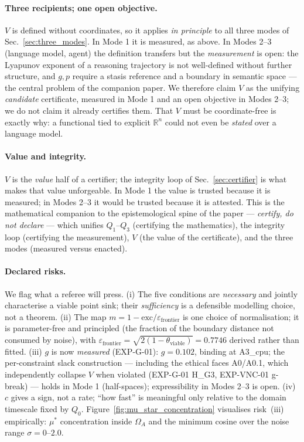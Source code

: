 \documentclass[11pt, a4paper]{article}
\newcommand{\R}{\mathbb{R}}
\begin{document}
\paragraph{Three recipients; one open objective.} $V$ is defined without
coordinates, so it applies \emph{in principle} to all three modes of
Sec.~\ref{sec:three_modes}. In Mode 1 it is measured, as above. In Modes 2--3
(language model, agent) the definition transfers but the \emph{measurement} is
open: the Lyapunov exponent of a reasoning trajectory is not well-defined without
further structure, and $g, p$ require a stasis reference and a boundary in
semantic space --- the central problem of the companion paper. We therefore
claim $V$ as the unifying \emph{candidate} certificate, measured in Mode 1 and an
open objective in Modes 2--3; we do not claim it already certifies them. That
$V$ must be coordinate-free is exactly why: a functional tied to explicit $\R^n$
could not even be \emph{stated} over a language model.

\paragraph{Value and integrity.} $V$ is the \emph{value} half of a certifier; the
integrity loop of Sec.~\ref{sec:certifier} is what makes that value unforgeable.
In Mode 1 the value is trusted because it is measured; in Modes 2--3 it would be
trusted because it is attested. This is the mathematical companion to the
epistemological spine of the paper --- \emph{certify, do not declare} ---
which unifies $Q_1$--$Q_3$ (certifying the mathematics), the integrity loop
(certifying the measurement), $V$ (the value of the certificate), and the three
modes (measured versus enacted).

\paragraph{Declared risks.} We flag what a referee will press. (i) The five
conditions are \emph{necessary} and jointly characterise a viable point sink;
their \emph{sufficiency} is a defensible modelling choice, not a theorem.
(ii) The map $m = 1 - \mathrm{exc}/\varepsilon_\text{frontier}$ is one choice of
normalisation; it is parameter-free and principled (the fraction of the boundary
distance not consumed by noise), with
$\varepsilon_\text{frontier} = \sqrt{2(1-\theta_\text{viable})} = 0.7746$ derived
rather than fitted. (iii) $g$ is now \emph{measured} (EXP-G-01): $g = 0.102$, binding at A3\_cpu;
the per-constraint slack construction --- including the ethical faces A0/A0.1,
which independently collapse $V$ when violated (EXP-G-01 H\_G3, EXP-VNC-01
g-break) --- holds in Mode 1 (half-spaces); expressibility in Modes 2--3 is open. (iv) $c$ gives a sign, not a rate; ``how
fast'' is meaningful only relative to the domain timescale fixed by $Q_0$.
Figure~\ref{fig:mu_star_concentration} visualises risk~(iii) empirically:
$\mu^*$ concentration inside $\Omega_A$ and the minimum cosine over the
noise range $\sigma=0$--$2.0$.
\end{document}
